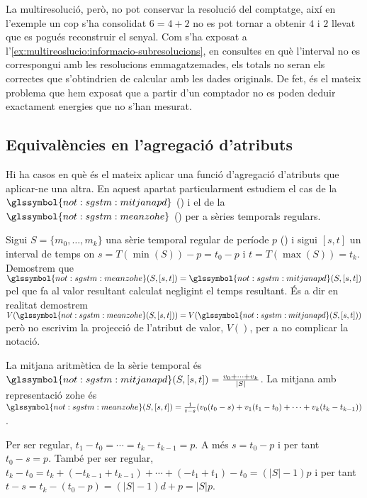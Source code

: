   


La multiresolució, però, no pot conservar la resolució del comptatge,
així en l'exemple un cop s'ha consolidat $6=4+2$ no es pot tornar a
obtenir $4$ i $2$ llevat que es pogués reconstruir el senyal.  Com
s'ha exposat a
l'\autoref{ex:multireoslucio:informacio-subresolucions}, en consultes
en què l'interval no es correspongui amb les resolucions
emmagatzemades, els totals no seran els correctes que s'obtindrien de
calcular amb les dades originals.  De fet, és el mateix problema que
hem exposat que a partir d'un comptador no es poden deduir exactament
energies que no s'han mesurat.








\subsection{Equivalències en l'agregació d'atributs}

Hi ha casos en què és el mateix aplicar una funció d'agregació
d'atributs que aplicar-ne una altra. En aquest apartat particularment
estudiem el cas de la $\glssymbol{not:sgstm:mitjanapd}$
() i el de la
$\glssymbol{not:sgstm:meanzohe}$ ()
per a sèries temporals regulars.

Sigui $S=\{m_0,\dotsc,m_k\}$ una sèrie temporal
regular de període $p$ () i sigui $[s,t]$
un interval de temps on $s=T(\min(S))-p=t_0-p$ i
$t=T(\max(S))=t_k$.  Demostrem que
$\glssymbol{not:sgstm:meanzohe}(S,[s,t]) =
\glssymbol{not:sgstm:mitjanapd}(S,[s,t])$ pel que fa al valor
resultant calculat negligint el temps resultant. És a dir en realitat demostrem
$V(\glssymbol{not:sgstm:meanzohe}(S,[s,t])) =
V(\glssymbol{not:sgstm:mitjanapd}(S,[s,t]))$ però no escrivim la
projecció de l'atribut de valor, $V()$, per a no complicar la notació.

La mitjana aritmètica de la sèrie temporal és
$\glssymbol{not:sgstm:mitjanapd}(S,[s,t])=\frac{v_0+\dotsb+v_k}{|S|}$.
%
La mitjana amb representació \gls{zohe} és
$\glssymbol{not:sgstm:meanzohe}(S,[s,t])= \frac{1}{t-s} (
v_0(t_0-s)+v_1(t_1-t_0)+\dotsb+ v_k(t_k-t_{k-1}) )$.

Per ser regular, $t_1-t_0 = \dotsb = t_k-t_{k-1} = p$. A més
$s=t_0-p$ i per tant $t_0-s = p$. També per ser regular, $t_k-t_0=
t_k +(- t_{k-1} + t_{k-1}) + \dotsb + (- t_1 + t_1) - t_0 = (|S|-1)p$
i per tant $t-s=t_k - (t_0 - p) = (|S|-1)d +p = |S|p$.

